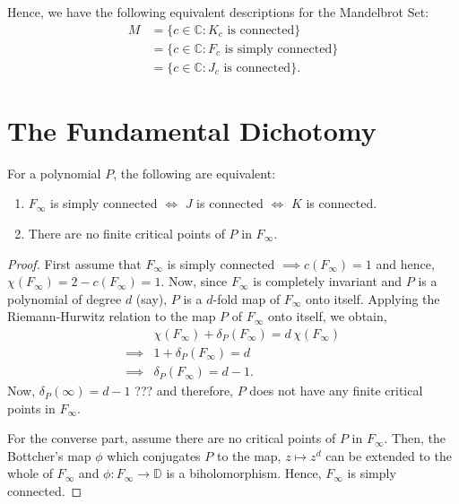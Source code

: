 \noindent Hence, we have the following equivalent descriptions for the Mandelbrot Set:
\begin{align*}
	M &=\{c\in \mathbb{C}:K_c \text{ is connected}\}\\
	  &=\{c\in \mathbb{C}:F_c \text{ is simply connected}\}\\
	  &=\{c\in \mathbb{C}:J_c \text{ is connected}\}
.\end{align*}

\section{The Fundamental Dichotomy}
\begin{theorem}
	For a polynomial \( P \), the following are equivalent:
	\begin{enumerate}
		\item \( F_\infty \) is simply connected \( \iff \) \( J \) is connected \( \iff \) \( K \) is connected.
		\item There are no finite critical points of \( P \) in \( F_\infty \).
	\end{enumerate}
\end{theorem}
\begin{proof}
	First assume that \( F_\infty \) is simply connected \( \implies c(F_\infty)=1 \) and hence, \( \chi(F_\infty)=2-c(F_\infty)=1 \).
	Now, since \( F_\infty \) is completely invariant and \( P \) is a polynomial of degree \( d \) (say), \( P \) is a \( d \)-fold
	map of \( F_\infty \) onto itself.
	Applying the Riemann-Hurwitz relation to the map \( P \) of \( F_\infty \) onto itself, we obtain,
	\begin{align*}
		&\chi(F_\infty)+\delta_P(F_\infty)=d\,\chi(F_\infty)\\
		\implies & 1+\delta_P(F_\infty)=d\\
		\implies & \delta_P(F_\infty)=d-1
	.\end{align*}
	Now, \( \delta_P(\infty)=d-1 \) ??? and therefore, \( P \) does not have any finite critical points in \( F_\infty \).

	For the converse part, assume there are no critical points of \( P \) in \( F_\infty \). Then, the Bottcher's map \( \phi \) which
	conjugates \( P \) to the map, \( z\mapsto z^d \) can be extended to the whole of \( F_\infty \) and \( \phi:F_\infty\to \mathbb{D} \)
	is a biholomorphism. Hence, \( F_\infty \) is simply connected.
\end{proof}

